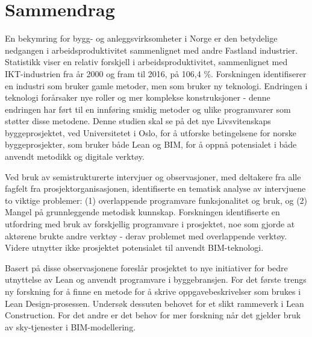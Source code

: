 \clearpage
{} 				
\setcounter{page}{1}

\pagestyle{fancy}
\fancyhf{}
\renewcommand{\chaptermark}[1]{\markboth{\chaptername\ \thechapter.\ #1}{}}
\renewcommand{\sectionmark}[1]{\markright{\thesection\ #1}}
\renewcommand{\headrulewidth}{0.1ex}
\renewcommand{\footrulewidth}{0.1ex}
\fancyfoot[LE,RO]{\thepage}
\fancypagestyle{plain}{\fancyhf{}\fancyfoot[LE,RO]{\thepage}\renewcommand{\headrulewidth}{0ex}}

\section*{\Large Sammendrag}

\noindent En bekymring for bygg- og anleggsvirksomheter i Norge er den betydelige nedgangen i arbeidsproduktivitet sammenlignet med andre Fastland industrier. Statistikk viser en relativ forskjell i arbeidsproduktivitet, sammenlignet med IKT-industrien fra år 2000 og fram til 2016, på 106,4 \%. Forskningen identifiserer en industri som bruker gamle metoder, men som bruker ny teknologi. Endringen i teknologi forårsaker nye roller og mer komplekse konstruksjoner - denne endringen har ført til en innføring smidig metoder og ulike programvarer som støtter disse metodene. Denne studien skal se på det nye Livsvitenskaps byggeprosjektet, ved Universitetet i Oslo, for å utforske betingelsene for norske byggeprosjekter, som bruker både Lean og BIM, for å oppnå potensialet i både anvendt metodikk og digitale verktøy.

Ved bruk av semistrukturerte intervjuer og observasjoner, med deltakere fra alle fagfelt fra prosjektorganisasjonen, identifiserte en tematisk analyse av intervjuene to viktige problemer: (1) overlappende programvare funksjonalitet og bruk, og (2) Mangel på grunnleggende metodisk kunnskap. Forskningen identifiserte en utfordring med bruk av forskjellig programvare i prosjektet, noe som gjorde at aktørene brukte andre verktøy - derav problemet med overlappende verktøy. Videre utnytter ikke prosjektet potensialet til anvendt BIM-teknologi.

Basert på disse observasjonene foreslår prosjektet to nye initiativer for bedre utnyttelse av Lean og anvendt programvare i byggebransjen. For det første trengs ny forskning for å finne en metode for å skrive oppgavebeskrivelser som brukes i Lean Design-prosessen. Undersøk dessuten behovet for et slikt rammeverk i Lean Construction. For det andre er det behov for mer forskning når det gjelder bruk av sky-tjenester i BIM-modellering.
\clearpage